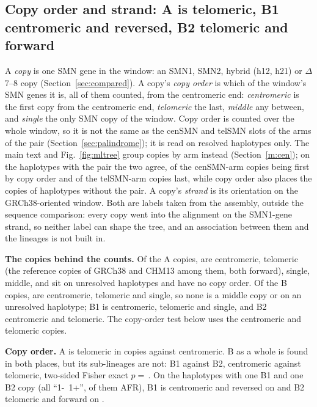 \subsection{Copy order and strand: A is telomeric, B1 centromeric and reversed, B2 telomeric and forward}\label{sec:posstrand}
A \emph{copy} is one SMN gene in the window: an SMN1, SMN2, hybrid (h12, h21) or $\Delta$7--8 copy (Section~\ref{sec:compared}). A copy's \emph{copy order} is which of the window's SMN genes it is, all of them
counted, from the centromeric end: \emph{centromeric} is the first copy from the centromeric end, \emph{telomeric} the last, \emph{middle} any
between, and \emph{single} the only SMN copy of the window. Copy order is counted over the whole window, so it is not the same as the cenSMN and telSMN slots of the arms of the  pair (Section~\ref{sec:palindrome}); it is read on resolved haplotypes only. The main text and Fig.~\ref{fig:mltree} group copies by arm instead (Section~\ref{m:cen}); on the haplotypes with the pair the two agree, \coCenFirst{} of the \coCenN{} cenSMN-arm copies being first by copy order and \coTelLast{} of the \coTelN{} telSMN-arm copies last, while copy order also places the copies of haplotypes without the pair. A copy's
\emph{strand} is its orientation on the GRCh38-oriented window. Both are labels taken from the assembly, outside the
sequence comparison: every copy went into the alignment on the SMN1-gene strand, so neither label can shape the tree,
and an association between them and the lineages is not built in.

\textbf{The copies behind the counts.} Of the \linA{} A copies, \linACen{} are centromeric, \linATel{} telomeric (the
\linRef{} reference copies of GRCh38 and CHM13 among them, both forward), \linASingle{} single, \linAMid{} middle, and
\linAUnres{} sit on unresolved haplotypes and have no copy order. Of the \linB{} B copies, \linBCen{} are centromeric,
\linBTel{} telomeric and \linBSingle{} single, so none is a middle copy or on an unresolved haplotype; B1 is \linBoneCen{} centromeric, \linBoneTel{} telomeric and
\linBoneSingle{} single, and B2 \linBtwoCen{} centromeric and \linBtwoTel{} telomeric. The copy-order test below uses
the \linPosN{} centromeric and telomeric copies.

\textbf{Copy order.} A is telomeric in \linATel{} copies against \linACen{} centromeric. B as a whole is found in both
places, but its sub-lineages are not: B1 against B2, centromeric against telomeric, two-sided Fisher exact
$p=$\,\linSubPpos. On the \linMixHaps{} haplotypes with one B1 and one B2 copy (all ``1-~1+'', \linMixAfr{} of them
AFR), B1 is centromeric and reversed on \linMixBoneCenRev{} and B2 telomeric and forward on \linMixBtwoTelFwd.

